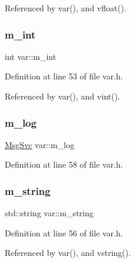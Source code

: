 Referenced by var(), and vfloat().

\mbox{\label{classvar_a2796c70baa395a5e2c5457df760249d7}} 
\subsubsection{\texorpdfstring{m\+\_\+int}{m\_int}}
{\footnotesize\ttfamily int var\+::m\+\_\+int\hspace{0.3cm}{\ttfamily [private]}}



Definition at line 53 of file var.\+h.



Referenced by var(), and vint().

\mbox{\label{classvar_a5dfdc5180270038b686ad3013874a026}} 
\subsubsection{\texorpdfstring{m\+\_\+log}{m\_log}}
{\footnotesize\ttfamily \hyperlink{classMsgSvc}{Msg\+Svc} var\+::m\+\_\+log\hspace{0.3cm}{\ttfamily [private]}}



Definition at line 58 of file var.\+h.

\mbox{\label{classvar_a81567a7f3af11ceee9a0624648e0e904}} 
\subsubsection{\texorpdfstring{m\+\_\+string}{m\_string}}
{\footnotesize\ttfamily std\+::string var\+::m\+\_\+string\hspace{0.3cm}{\ttfamily [private]}}



Definition at line 56 of file var.\+h.



Referenced by var(), and vstring().

\mbox{\label{classvar_afd0bde61955d8a7541d3dcedc22ec2ad}} 
